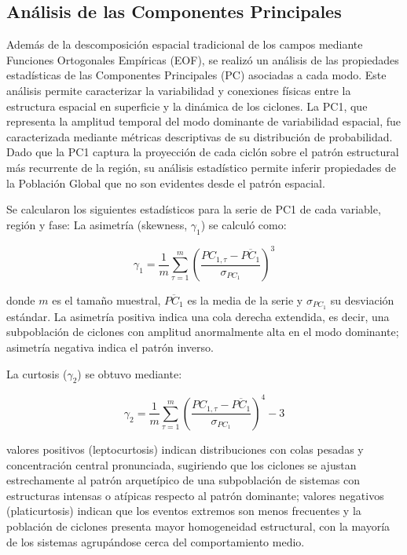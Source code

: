 \subsection{Análisis de las Componentes Principales}\label{subsec:analisis_pc}

Además de la descomposición espacial tradicional de los campos mediante Funciones Ortogonales Empíricas (EOF), se realizó un análisis de las propiedades estadísticas de las Componentes Principales (PC) asociadas a cada modo. 
Este análisis permite caracterizar la variabilidad y conexiones físicas entre la estructura espacial en superficie y la dinámica de los ciclones.
La PC1, que representa la amplitud temporal del modo dominante de variabilidad espacial, fue caracterizada mediante métricas descriptivas de su distribución de probabilidad. 
Dado que la PC1 captura la proyección de cada ciclón sobre el patrón estructural más recurrente de la región, su análisis estadístico permite inferir propiedades de la Población Global que no son evidentes desde el patrón espacial.

Se calcularon los siguientes estadísticos para la serie de PC1 de cada variable, región y fase:
La asimetría (skewness, $\gamma_1$) se calculó como:

\begin{equation}
    \gamma_1 = \frac{1}{m} \sum_{\tau=1}^{m} \left(\frac{PC_{1,\tau} - \overline{PC_1}}{\sigma_{PC_1}}\right)^3
\end{equation}

donde $m$ es el tamaño muestral, $\overline{PC_1}$ es la media de la serie y $\sigma_{PC_1}$ su desviación estándar. La asimetría positiva indica una cola derecha extendida, es decir, una subpoblación de ciclones con amplitud anormalmente alta en el modo dominante; asimetría negativa indica el patrón inverso.

La curtosis ($\gamma_2$) se obtuvo mediante:

\begin{equation}
    \gamma_2 = \frac{1}{m} \sum_{\tau=1}^{m} \left(\frac{PC_{1,\tau} - \overline{PC_1}}{\sigma_{PC_1}}\right)^4 - 3
\end{equation}

valores positivos (leptocurtosis) indican distribuciones con colas pesadas y concentración central pronunciada, sugiriendo que los ciclones se ajustan estrechamente al patrón arquetípico de una subpoblación de sistemas con estructuras intensas o atípicas respecto al patrón dominante; valores negativos (platicurtosis) indican que los eventos extremos son menos frecuentes y la población de ciclones presenta mayor homogeneidad estructural, con la mayoría de los sistemas agrupándose cerca del comportamiento medio.

